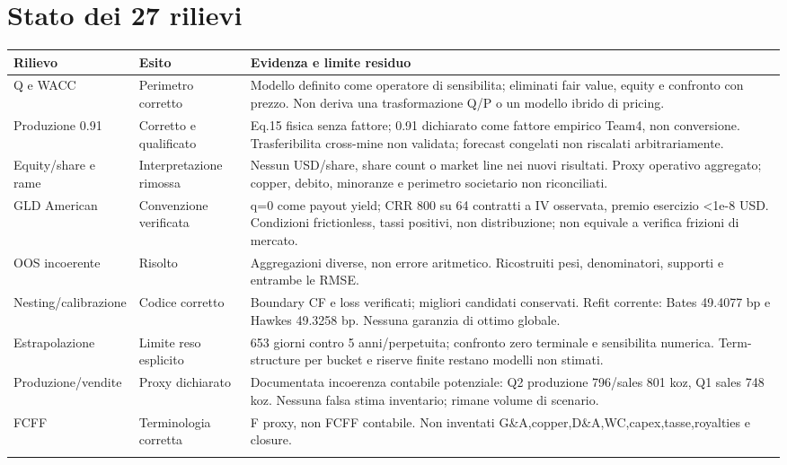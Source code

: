 \documentclass[10pt,a4paper]{article}
\begin{document}
\section{Stato dei 27 rilievi}
\begin{longtable}{p{}p{}p{}}\toprule
Rilievo & Esito & Evidenza e limite residuo\\\midrule\endhead
Q e WACC & Perimetro corretto & Modello definito come operatore di sensibilita; eliminati fair value, equity e confronto con prezzo. Non deriva una trasformazione Q/P o un modello ibrido di pricing. \\ \addlinespace
Produzione 0.91 & Corretto e qualificato & Eq.15 fisica senza fattore; 0.91 dichiarato come fattore empirico Team4, non conversione. Trasferibilita cross-mine non validata; forecast congelati non riscalati arbitrariamente. \\ \addlinespace
Equity/share e rame & Interpretazione rimossa & Nessun USD/share, share count o market line nei nuovi risultati. Proxy operativo aggregato; copper, debito, minoranze e perimetro societario non riconciliati. \\ \addlinespace
GLD American & Convenzione verificata & q=0 come payout yield; CRR 800 su 64 contratti a IV osservata, premio esercizio <1e-8 USD. Condizioni frictionless, tassi positivi, non distribuzione; non equivale a verifica frizioni di mercato. \\ \addlinespace
OOS incoerente & Risolto & Aggregazioni diverse, non errore aritmetico. Ricostruiti pesi, denominatori, supporti e entrambe le RMSE. \\ \addlinespace
Nesting/calibrazione & Codice corretto & Boundary CF e loss verificati; migliori candidati conservati. Refit corrente: Bates 49.4077 bp e Hawkes 49.3258 bp. Nessuna garanzia di ottimo globale. \\ \addlinespace
Estrapolazione & Limite reso esplicito & 653 giorni contro 5 anni/perpetuita; confronto zero terminale e sensibilita numerica. Term-structure per bucket e riserve finite restano modelli non stimati. \\ \addlinespace
Produzione/vendite & Proxy dichiarato & Documentata incoerenza contabile potenziale: Q2 produzione 796/sales 801 koz, Q1 sales 748 koz. Nessuna falsa stima inventario; rimane volume di scenario. \\ \addlinespace
FCFF & Terminologia corretta & F proxy, non FCFF contabile. Non inventati G\&A,copper,D\&A,WC,capex,tasse,royalties e closure. \\ \addlinespace

\end{longtable}
\end{document}
